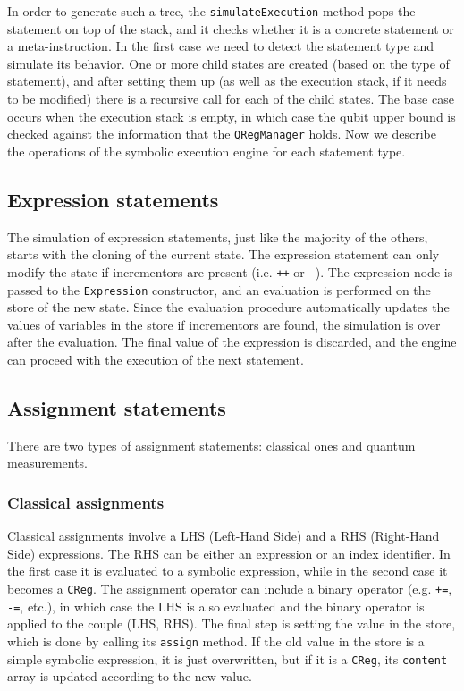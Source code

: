 \documentclass[12pt,a4paper]{report}
\theoremstyle{definition}
\theoremstyle{definition}
\theoremstyle{definition}
\begin{document}
In order to generate such a tree, the \texttt{simulateExecution} method pops the statement on top of the stack, and it checks whether it is a concrete statement or a meta-instruction. In the first case we need to detect the statement type and simulate its behavior. One or more child states are created (based on the type of statement), and after setting them up (as well as the execution stack, if it needs to be modified) there is a recursive call for each of the child states. The base case occurs when the execution stack is empty, in which case the qubit upper bound is checked against the information that the \texttt{QRegManager} holds.
Now we describe the operations of the symbolic execution engine for each statement type.

\subsection{Expression statements}
The simulation of expression statements, just like the majority of the others, starts with the cloning of the current state. The expression statement can only modify the state if incrementors are present (i.e. \texttt{++} or \texttt{--}). The expression node is passed to the \texttt{Expression} constructor, and an evaluation is performed on the store of the new state. Since the evaluation procedure automatically updates the values of variables in the store if incrementors are found, the simulation is over after the evaluation. The final value of the expression is discarded, and the engine can proceed with the execution of the next statement.
\subsection{Assignment statements}
There are two types of assignment statements: classical ones and quantum measurements.
\subsubsection{Classical assignments}
Classical assignments involve a LHS (Left-Hand Side) and a RHS (Right-Hand Side) expressions. The RHS can be either an expression or an index identifier. In the first case it is evaluated to a symbolic expression, while in the second case it becomes a \texttt{CReg}. The assignment operator can include a binary operator (e.g. \texttt{+=}, \texttt{-=}, etc.), in which case the LHS is also evaluated and the binary operator is applied to the couple (LHS, RHS).
The final step is setting the value in the store, which is done by calling its \texttt{assign} method. If the old value in the store is a simple symbolic expression, it is just overwritten, but if it is a \texttt{CReg}, its \texttt{content} array is updated according to the new value.
\end{document}
